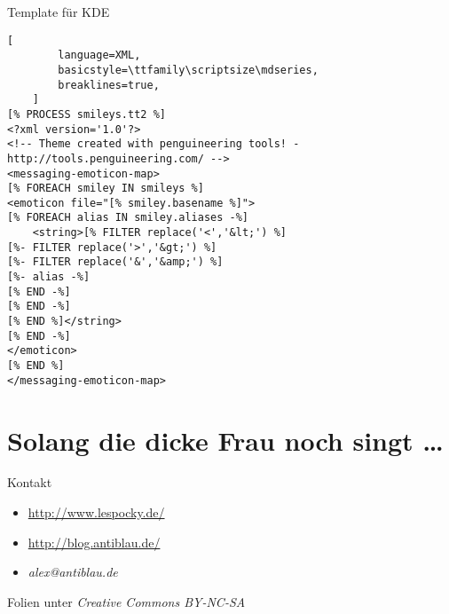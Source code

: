 \documentclass[hyperref={pdfpagelabels=false}]{beamer}
\begin{document}
\begin{frame}[fragile]{Template für KDE}
    \begin{lstlisting}[
        language=XML,
        basicstyle=\ttfamily\scriptsize\mdseries,
        breaklines=true,
    ]
[% PROCESS smileys.tt2 %]
<?xml version='1.0'?>
<!-- Theme created with penguineering tools! - http://tools.penguineering.com/ -->
<messaging-emoticon-map>
[% FOREACH smiley IN smileys %]
<emoticon file="[% smiley.basename %]">
[% FOREACH alias IN smiley.aliases -%]
    <string>[% FILTER replace('<','&lt;') %]
[%- FILTER replace('>','&gt;') %]
[%- FILTER replace('&','&amp;') %]
[%- alias -%]
[% END -%]
[% END -%]
[% END %]</string>
[% END -%]
</emoticon>
[% END %]
</messaging-emoticon-map>
    \end{lstlisting}
\end{frame}

\section*{Solang die dicke Frau noch singt \dots}

\begin{frame}{Kontakt}
    \begin{itemize}
        \item \url{http://www.lespocky.de/}
        \item \url{http://blog.antiblau.de/}
        \item \emph{alex@antiblau.de}
    \end{itemize}

    \vspace{1em}
    Folien unter \emph{Creative Commons BY-NC-SA}
\end{frame}
\end{document}

